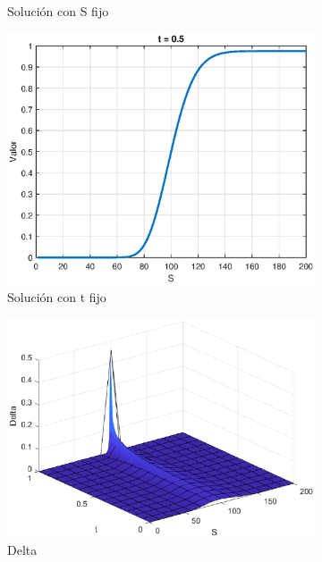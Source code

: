 \begin{figure}[H]
\begin{subfigure}[b]{0.35\linewidth}
        \caption{Solución con S fijo}
    \end{subfigure}
    \begin{subfigure}[b]{0.35\linewidth}
        \includegraphics[width=\linewidth]{Imagenes/Parte1/6_Sols/Binary_Call/BinaryCalltFIjo.eps}
        \caption{Solución con t fijo}
    \end{subfigure}
    \begin{subfigure}[b]{0.35\linewidth}
        \includegraphics[width=\linewidth]{Imagenes/Parte1/6_Sols/Binary_Call/Binary_Call_Delta.eps}
        \caption{Delta}
    \end{subfigure}
    \begin{subfigure}[b]{0.35\linewidth}

\end{subfigure}
\end{figure}
